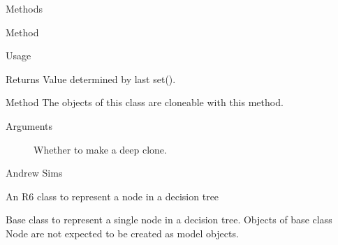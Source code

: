\documentclass[a4paper]{book}
\begin{document}
\begin{Section}{Methods}
\begin{SubSection}{Method }
\begin{SubSubSection}{Usage}
\end{SubSubSection}


%
\begin{SubSubSection}{Returns}
Value determined by last set().
\end{SubSubSection}

\end{SubSection}



\hypertarget{method-clone}{}
%
\begin{SubSection}{Method }
The objects of this class are cloneable with this method.
%


%
\begin{SubSubSection}{Arguments}

\begin{description}

\item[] Whether to make a deep clone.

\end{description}


\end{SubSubSection}

\end{SubSection}

\end{Section}
%
\begin{Author}\relax
Andrew Sims 
\end{Author}
%
\begin{Description}\relax
An R6 class to represent a node in a decision tree
\end{Description}
%
\begin{Details}\relax
Base class to represent a single node in a decision tree. Objects of base
class Node are not expected to be created as model objects.
\end{Details}
%
\end{document}
